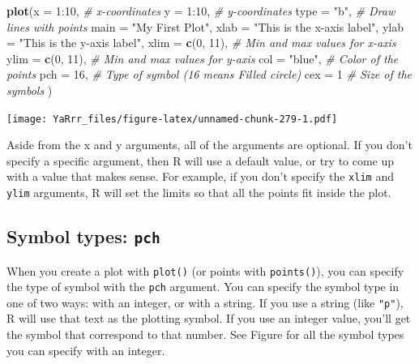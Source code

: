 \documentclass[]{book}
\newenvironment{Shaded}{\begin{snugshade}}{\end{snugshade}}
\newcommand{\KeywordTok}[1]{\textcolor[rgb]{0.13,0.29,0.53}{\textbf{{#1}}}}
\newcommand{\DataTypeTok}[1]{\textcolor[rgb]{0.13,0.29,0.53}{{#1}}}
\newcommand{\DecValTok}[1]{\textcolor[rgb]{0.00,0.00,0.81}{{#1}}}
\newcommand{\StringTok}[1]{\textcolor[rgb]{0.31,0.60,0.02}{{#1}}}
\newcommand{\CommentTok}[1]{\textcolor[rgb]{0.56,0.35,0.01}{\textit{{#1}}}}
\newcommand{\NormalTok}[1]{{#1}}
\theoremstyle{definition}
\theoremstyle{definition}
\theoremstyle{remark}
\begin{document}
\begin{Shaded}
\begin{Highlighting}[]
\KeywordTok{plot}\NormalTok{(}\DataTypeTok{x =} \DecValTok{1}\NormalTok{:}\DecValTok{10}\NormalTok{,                         }\CommentTok{# x-coordinates}
     \DataTypeTok{y =} \DecValTok{1}\NormalTok{:}\DecValTok{10}\NormalTok{,                         }\CommentTok{# y-coordinates}
     \DataTypeTok{type =} \StringTok{"b"}\NormalTok{,                       }\CommentTok{# Draw lines with points}
     \DataTypeTok{main =} \StringTok{"My First Plot"}\NormalTok{,}
     \DataTypeTok{xlab =} \StringTok{"This is the x-axis label"}\NormalTok{,}
     \DataTypeTok{ylab =} \StringTok{"This is the y-axis label"}\NormalTok{,}
     \DataTypeTok{xlim =} \KeywordTok{c}\NormalTok{(}\DecValTok{0}\NormalTok{, }\DecValTok{11}\NormalTok{),                  }\CommentTok{# Min and max values for x-axis}
     \DataTypeTok{ylim =} \KeywordTok{c}\NormalTok{(}\DecValTok{0}\NormalTok{, }\DecValTok{11}\NormalTok{),                  }\CommentTok{# Min and max values for y-axis}
     \DataTypeTok{col =} \StringTok{"blue"}\NormalTok{,                     }\CommentTok{# Color of the points}
     \DataTypeTok{pch =} \DecValTok{16}\NormalTok{,                         }\CommentTok{# Type of symbol (16 means Filled circle)}
     \DataTypeTok{cex =} \DecValTok{1}                           \CommentTok{# Size of the symbols}
     \NormalTok{)}
\end{Highlighting}
\end{Shaded}

\texttt{[image: YaRrr\_files/figure-latex/unnamed-chunk-279-1.pdf]}

Aside from the x and y arguments, all of the arguments are optional. If
you don't specify a specific argument, then R will use a default value,
or try to come up with a value that makes sense. For example, if you
don't specify the \texttt{xlim} and \texttt{ylim} arguments, R will set
the limits so that all the points fit inside the plot.

\subsection{\texorpdfstring{Symbol types:
\texttt{pch}}{Symbol types: pch}}\label{symbol-types-pch}

When you create a plot with \texttt{plot()} (or points with
\texttt{points()}), you can specify the type of symbol with the
\texttt{pch} argument. You can specify the symbol type in one of two
ways: with an integer, or with a string. If you use a string (like
\texttt{"p"}), R will use that text as the plotting symbol. If you use
an integer value, you'll get the symbol that correspond to that number.
See Figure for all the symbol types you can specify with an integer.
\end{document}
